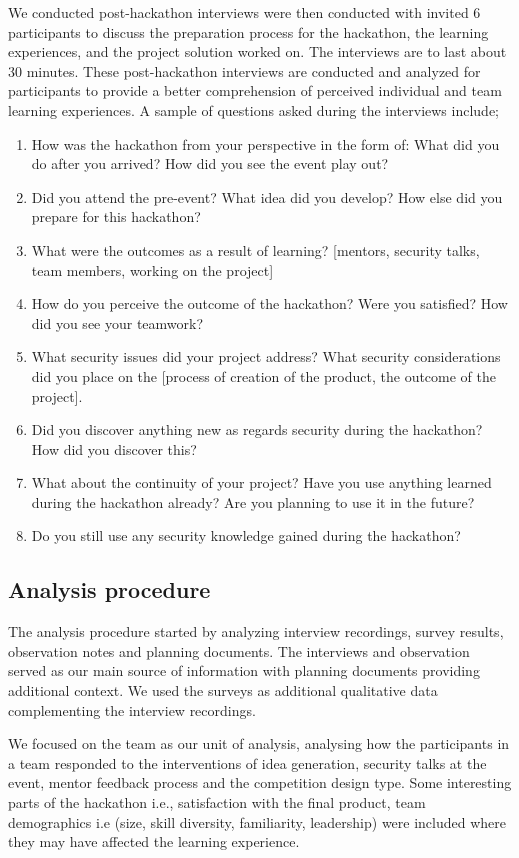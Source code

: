 \documentclass[runningheads]{llncs}
\begin{document}
We conducted post-hackathon interviews were then conducted with invited 6 participants to discuss the preparation process for the hackathon, the learning experiences, and the project solution worked on. The interviews are to last about 30 minutes. These post-hackathon interviews are conducted and analyzed for participants to provide a better comprehension of perceived individual and team learning experiences. A sample of questions asked during the interviews include;
\begin{enumerate}
    \item How was the hackathon from your perspective in the form of: What did you do after you arrived? How did you see the event play out? 
    \item Did you attend the pre-event? What idea did you develop? How else did you prepare for this hackathon?
    \item What were the outcomes as a result of learning? [mentors, security talks, team members, working on the project]
    \item How do you perceive the outcome of the hackathon? Were you satisfied? How did you see your teamwork? 
    \item What security issues did your project address? What security considerations did you place on the [process of creation of the product, the outcome of the project].
    \item Did you discover anything new as regards security during the hackathon? How did you discover this?
    \item What about the continuity of your project? Have you use anything learned during the hackathon already? Are you planning to use it in the future? 
    \item Do you still use any security knowledge gained during the hackathon?
\end{enumerate}


\subsection{Analysis procedure}
The analysis procedure started by analyzing interview recordings, survey results, observation notes and planning documents. The interviews and observation served as our main source of information with planning documents providing additional context. We used the surveys as additional qualitative data complementing the interview recordings.

We focused on the team as our unit of analysis, analysing how the participants in a team responded to the interventions of idea generation, security talks at the event, mentor feedback process and the competition design type. Some interesting parts of the hackathon i.e., satisfaction with the final product, team demographics i.e (size, skill diversity, familiarity, leadership) were included where they may have affected the learning experience.
\end{document}
